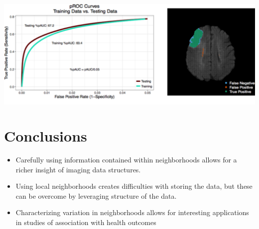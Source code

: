 \documentclass[a0,landscape]{a0poster}
\begin{document}
\begin{multicols}{3}
\begin{center}\vspace{.5cm}
\includegraphics[width=1\linewidth]{bothplots.pdf}
\end{center}\vspace{.5cm}

\large{\section*{\color{uwred}Conclusions}}
\begin{itemize}
\item  Carefully using information contained within neighborhoods allows for a richer insight of imaging data structures.
\item Using local neighborhoods creates difficulties with storing the data, but these can be overcome by leveraging structure of the data.
\item Characterizing variation in neighborhoods allows for interesting applications in studies of association with health outcomes 
\end{itemize}
\end{multicols}
\end{document}

